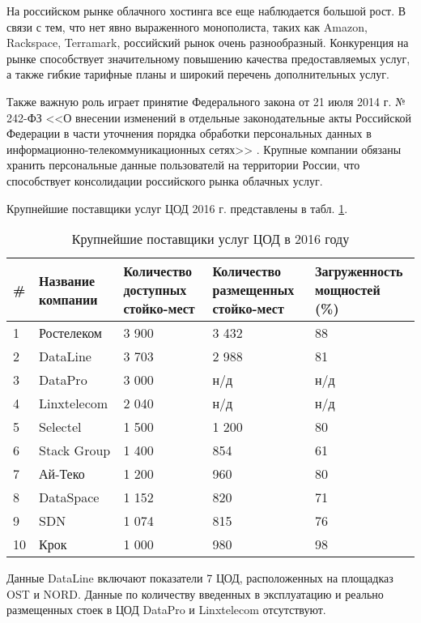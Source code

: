 На российском рынке облачного хостинга все еще наблюдается большой рост.
В связи с тем, что нет явно выраженного монополиста, таких как Amazon, Rackspace, Terramark, российский рынок очень разнообразный.
Конкуренция на рынке способствует значительному повышению качества предоставляемых услуг, а также гибкие тарифные планы и широкий перечень дополнительных услуг.

Также важную роль играет принятие Федерального закона от 21 июля 2014 г. № 242-ФЗ <<О внесении изменений в отдельные законодательные акты Российской Федерации в части уточнения порядка обработки персональных данных в информационно-телекоммуникационных сетях>> \cite{minsvyaz}.
Крупные компании обязаны хранить персональные данные пользователй на территории России, что способствует консолидации российского рынка облачных услуг.

Крупнейшие поставщики услуг ЦОД 2016 г. \cite{cnews} представлены в табл. \ref{dc-table}.
\begin{table}[H]
  \caption{Крупнейшие поставщики услуг ЦОД в 2016 году}\label{dc-table}
  \begin{tabular}{|p{0.6cm}|p{2.6cm}|p{3cm}|p{3.5cm}|p{3.5cm}|}
  \hline \# & Название компании & Количество доступных стойко-мест & Количество размещенных стойко-мест & Загруженность мощностей (\%) \\
  \hline 1 & Ростелеком & 3 900 & 3 432 & 88 \\
  \hline 2 & DataLine & 3 703 & 2 988 & 81 \\
  \hline 3 & DataPro & 3 000 & н/д & н/д \\
  \hline 4 & Linxtelecom & 2 040 & н/д & н/д \\
  \hline 5 & Selectel & 1 500 & 1 200 & 80 \\
  \hline 6 & Stack Group & 1 400 & 854 & 61 \\
  \hline 7 & Ай-Теко & 1 200 & 960 & 80 \\
  \hline 8 & DataSpace & 1 152 & 820 & 71 \\
  \hline 9 & SDN & 1 074 & 815 & 76 \\
  \hline 10 & Крок & 1 000 & 980 & 98 \\
  \hline
  \end{tabular}
\end{table}

Данные DataLine включают показатели 7 ЦОД, расположенных на площадказ OST и NORD.
Данные по количеству введенных в эксплуатацию и реально размещенных стоек в ЦОД DataPro и Linxtelecom отсутствуют.

